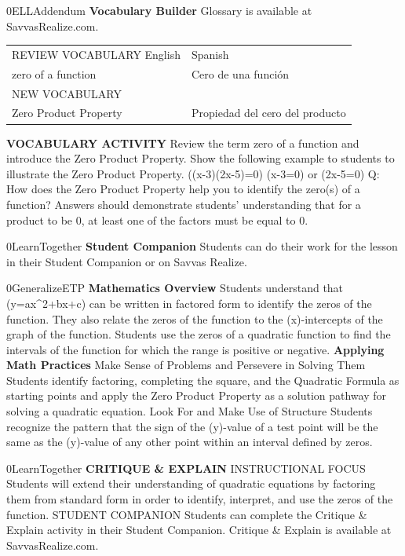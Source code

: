 \documentclass{article}
\newenvironment{te-addendum}[2]{}{}     %
\newcommand{\placeholder}[2]{}          %
\begin{document}
\begin{te-addendum}{0}{ELLAddendum}
\textbf{Vocabulary Builder}
Glossary is available at SavvasRealize.com.
\begin{tabular}{ll}
REVIEW VOCABULARY English & Spanish \\
zero of a function & Cero de una función \\
NEW VOCABULARY & \\
Zero Product Property & Propiedad del cero del producto \\
\end{tabular}
\textbf{VOCABULARY ACTIVITY}
Review the term zero of a function and introduce the Zero Product Property.
Show the following example to students to illustrate the Zero Product Property.
((x-3)(2x-5)=0)
(x-3=0) or (2x-5=0)
Q: How does the Zero Product Property help you to identify the zero(s) of a function?
Answers should demonstrate students' understanding that for a product to be 0, at least one of the factors must be equal to 0.
\end{te-addendum}
\begin{te-addendum}{0}{LearnTogether}
\textbf{Student Companion}
Students can do their work for the lesson in their Student Companion or on Savvas Realize.
\placeholder{illustration}{Student Companion cover, dark background with blue and purple spherical artwork, labeled Student Companion, enVision Algebra 2, SAVVAS.}
\end{te-addendum}
\begin{te-addendum}{0}{GeneralizeETP}
\textbf{Mathematics Overview}
Students understand that (y=ax^2+bx+c) can be written in factored form to identify the zeros of the function. They also relate the zeros of the function to the (x)-intercepts of the graph of the function.
Students use the zeros of a quadratic function to find the intervals of the function for which the range is positive or negative.
\textbf{Applying Math Practices}
Make Sense of Problems and Persevere in Solving Them
Students identify factoring, completing the square, and the Quadratic Formula as starting points and apply the Zero Product Property as a solution pathway for solving a quadratic equation.
Look For and Make Use of Structure
Students recognize the pattern that the sign of the (y)-value of a test point will be the same as the (y)-value of any other point within an interval defined by zeros.
\end{te-addendum}
\begin{te-addendum}{0}{LearnTogether}
\textbf{CRITIQUE \& EXPLAIN}
INSTRUCTIONAL FOCUS Students will extend their understanding of quadratic equations by factoring them from standard form in order to identify, interpret, and use the zeros of the function.
STUDENT COMPANION Students can complete the Critique \& Explain activity in their Student Companion.
Critique \& Explain is available at SavvasRealize.com.
\end{te-addendum}
\end{document}
